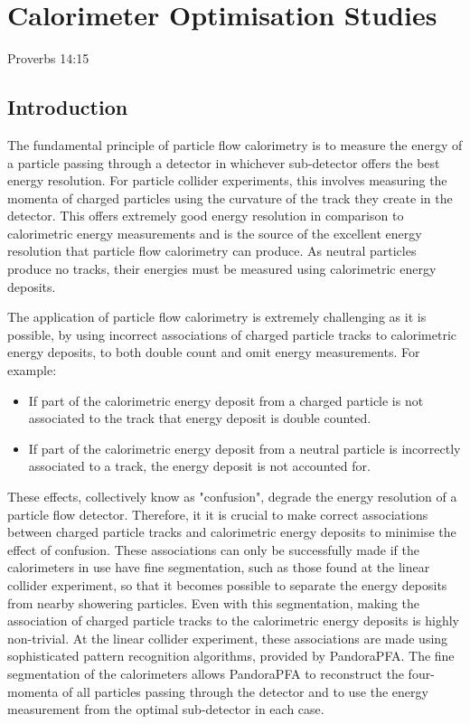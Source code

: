 \chapter{Calorimeter Optimisation Studies}
\label{chap:detopt}

{Proverbs 14:15}


\section{Introduction}
\label{sec:optimisationstudies}
The fundamental principle of particle flow calorimetry is to measure the energy of a particle passing through a detector in whichever sub-detector offers the best energy resolution.  For particle collider experiments, this involves measuring the momenta of charged particles using the curvature of the track they create in the detector.  This offers extremely good energy resolution in comparison to calorimetric energy measurements and is the source of the excellent energy resolution that particle flow calorimetry can produce.  As neutral particles produce no tracks, their energies must be measured using calorimetric energy deposits.  

The application of particle flow calorimetry is extremely challenging as it is possible, by using incorrect associations of charged particle tracks to calorimetric energy deposits, to both double count and omit energy measurements.  For example:
\begin{itemize}
\item If part of the calorimetric energy deposit from a charged particle is not associated to the track that energy deposit is double counted.
\item If part of the calorimetric energy deposit from a neutral particle is incorrectly associated to a track, the energy deposit is not accounted for.
\end{itemize}
\noindent These effects, collectively know as "confusion", degrade the energy resolution of a particle flow detector.  Therefore, it it is crucial to make correct associations between charged particle tracks and calorimetric energy deposits to minimise the effect of confusion.  These associations can only be successfully made if the calorimeters in use have fine segmentation, such as those found at the linear collider experiment, so that it becomes possible to separate the energy deposits from nearby showering particles.  Even with this segmentation, making the association of charged particle tracks to the calorimetric energy deposits is highly non-trivial.  At the linear collider experiment, these associations are made using sophisticated pattern recognition algorithms, provided by PandoraPFA.  The fine segmentation of the calorimeters allows PandoraPFA to reconstruct the four-momenta of all particles passing through the detector and to use the energy measurement from the optimal sub-detector in each case. 

